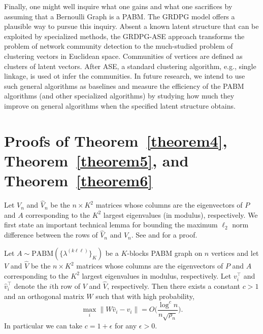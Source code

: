 \documentclass[12pt]{article}
\begin{document}
Finally, one might well inquire what one gains and what one sacrifices
by assuming that a Bernoulli Graph is a PABM.  The GRDPG model offers
a plausible way to pursue this inquiry.  Absent a known latent
structure that can be exploited by specialized methods, the GRDPG-ASE
approach transforms the problem of network community detection to the
much-studied problem of clustering vectors in Euclidean space.
Communities of vertices are defined as clusters of latent vectors.
After ASE, a standard clustering algorithm, e.g., single linkage, is
used ot infer the communities.  In future research, we intend to use
such general algorithms as baselines and measure the efficiency of the
PABM algorithms (and other specialized algorithms) by studying how
much they improve on general algorithms when the specified latent
structure obtains.

\appendix
\renewcommand\refname{References}
% 
% 
\printbibliography

\hypertarget{proofs}{%
\section{Proofs of Theorem~\ref{theorem4}, Theorem~\ref{theorem5}, and Theorem~\ref{theorem6}}}
Let \(V_n\) and \(\hat{V}_n\)
be the $n \times K^2$ matrices whose columns are the eigenvectors of \(P\) and \(A\) corresponding to the
$K^2$ largest eigenvalues (in modulus), respectively. 
We first state an important technical lemma for bounding the maximum
$\ell_2$ norm difference between the rows of $\hat{V}_n$ and
$V_n$. See \citet{cape_biometrika} and 
\citet[Lemma~5]{rubindelanchy2017statistical} for a proof. 

\begin{lemma}
\label{lem:technical}
Let $A \sim \mathrm{PABM}(\{\lambda^{(k \ell \ell)}\}_{K})$ be a $K$-blocks
PABM graph on $n$ vertices and let \(V\) and \(\hat{V}\)
be the $n \times K^2$ matrices whose columns are the eigenvectors of 
\(P\) and \(A\) corresponding to the
$K^2$ largest eigenvalues in modulus, respectively.
Let \(v_i^\top\) and \(\hat{v}_i^\top\) denote the $i$th 
row of \(V\) and \(\hat{V}\), respectively. 
Then there exists a constant $c > 1$ and an orthogonal matrix $W$ such
that with high probability,
$$\max_{i} \|W \hat{v}_i - v_i\|  = O\Big(\frac{\log^{c}n}{n \sqrt{\rho_n}} \Big).$$
In particular we can take $c = 1 + \epsilon$ for any $\epsilon > 0$. 
\end{lemma}
\end{document}
